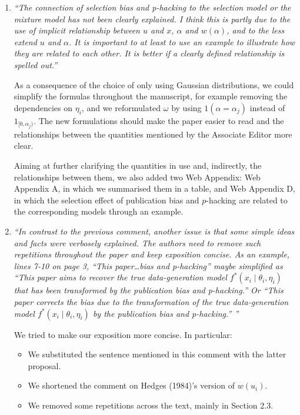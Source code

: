\documentclass[11pt]{article}
\begin{document}
\begin{enumerate}

\item \emph{``The connection of selection bias and p-hacking to the selection model or the mixture model has not been clearly explained. I think this is partly due to the use of implicit relationship between $u$ and $x$, $\alpha$ and $w(\alpha)$, and to the less extend $u$ and $\alpha$. It is important to at least to use an example to illustrate how they are related to each other. It is better if a clearly defined relationship is spelled out.''}

As a consequence of the choice of only using Gaussian distributions, we could simplify the formulas throughout the manuscript, for example removing the dependencies on $\eta_i$, and we reformulated $\omega$ by using $1(\alpha = \alpha_j)$ instead of $1_{[0,\alpha_j)}$. The new formulations should make the paper easier to read and the relationships between the quantities mentioned by the Associate Editor more clear.

Aiming at further clarifying the quantities in use and, indirectly, the relationships between them, we also added two Web Appendix: Web Appendix A, in which we summarised them in a table, and Web Appendix D, in which the selection effect of publication bias and $p$-hacking are related to the corresponding models through an example. \\


\item \emph{``In contrast to the previous comment, another issue is that some simple ideas and facts were verbosely explained. The authors need to remove such repetitions throughout the paper and keep exposition concise. As an example, lines 7-10 on page 3, ``This paper\dots bias and p-hacking'' maybe simplified as ``This paper aims to recover the true data-generation model $f^*(x_i \mid \theta_i , \eta_i)$ that has been transformed by the publication bias and p-hacking.'' Or ``This paper corrects the bias due to the transformation of the true data-generation model $f^*(x_i \mid \theta_i , \eta_i )$ by the publication bias and p-hacking.'' ''}

We tried to make our exposition more concise. In particular:
\begin{itemize}
    \item We substituted the sentence mentioned in this comment with the latter proposal.
    \item We shortened the comment on Hedges (1984)'s version of $w(u_i)$.
    \item We removed some repetitions across the text, mainly in Section 2.3.
\end{itemize}
\vspace{11pt}


\end{enumerate}
\end{document}
